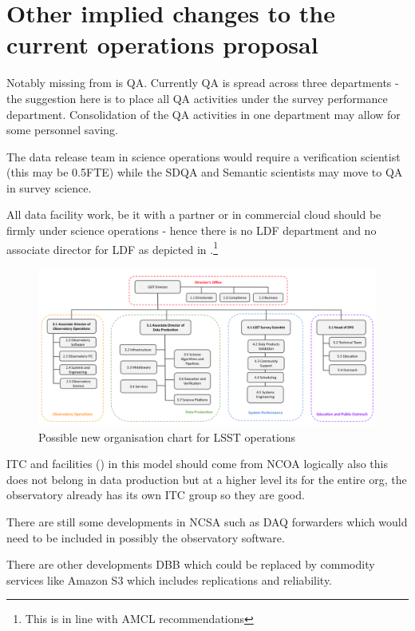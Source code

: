 \section{Other implied changes to the current operations proposal}
Notably missing from  is \gls{QA}. Currently \gls{QA} is spread across  three
 departments - the suggestion here is to place all \gls{QA} activities under the survey performance department. Consolidation
of the \gls{QA} activities in one department may allow for some personnel saving.

The data release team in science operations would require a verification scientist 
(this may be 0.5FTE) while the \gls{SDQA} and Semantic scientists may move to QA in survey science.

All data facility work, be it with a partner or in commercial \gls{cloud} should be 
firmly under science operations - hence there is no \gls{LDF} department and no associate director 
for \gls{LDF} as depicted in .\footnote{This is  in line with AMCL recommendations}

\begin{figure}
\includegraphics[width=1.0\textwidth]{figures/OpsOrg2}
\caption{Possible new organisation chart for \gls{LSST}  operations \label{fig:opsorg}}
\end{figure}


ITC and facilities () in this model should come from \gls{NCOA}  logically also this does not belong in data production but at a higher level its for the entire org, the observatory already has its own \gls{ITC} group so they are good.

There are still some developments in \gls{NCSA} such as \gls{DAQ} forwarders which would need to be included in possibly the observatory \gls{software}.

There are other developments \gls{DBB} which could be replaced by commodity services like Amazon \gls{S3} which includes replications and reliability.
